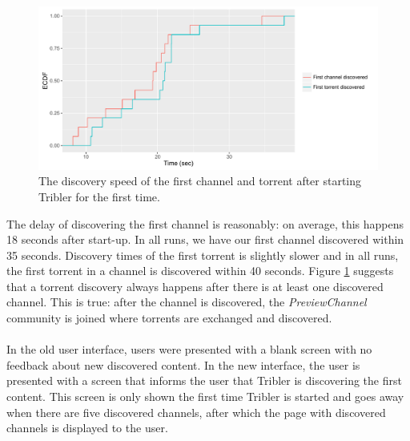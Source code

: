 \begin{figure}[!h]
	\centering
	\includegraphics[width=1.0\columnwidth]{images/experiments/content_discovery}
	\caption{The discovery speed of the first channel and torrent after starting Tribler for the first time.}
	\label{fig:content_discovery_speed}
\end{figure}

The delay of discovering the first channel is reasonably: on average, this happens 18 seconds after start-up. In all runs, we have our first channel discovered within 35 seconds. Discovery times of the first torrent is slightly slower and in all runs, the first torrent in a channel is discovered within 40 seconds. Figure \ref{fig:content_discovery_speed} suggests that a torrent discovery always happens after there is at least one discovered channel. This is true: after the channel is discovered, the \emph{PreviewChannel} community is joined where torrents are exchanged and discovered.\\\\
In the old user interface, users were presented with a blank screen with no feedback about new discovered content. In the new interface, the user is presented with a screen that informs the user that Tribler is discovering the first content. This screen is only shown the first time Tribler is started and goes away when there are five discovered channels, after which the page with discovered channels is displayed to the user.

